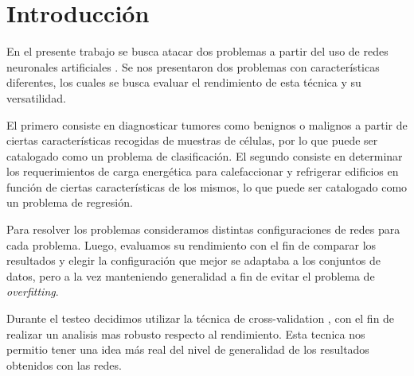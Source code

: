 \documentclass[informe.tex]{subfiles}
\begin{document}
  
  \section{Introducción}

  En el presente trabajo se busca atacar dos problemas a partir del uso de redes neuronales artificiales \cite{hertz}. Se nos presentaron dos problemas con características diferentes, los cuales se busca evaluar el rendimiento de esta técnica y su versatilidad. 
  
  El primero consiste en diagnosticar tumores como benignos o malignos a partir de ciertas características recogidas de muestras de células, por lo que puede ser catalogado como un problema de clasificación. El segundo consiste en determinar los requerimientos de carga energética para calefaccionar y refrigerar edificios en función de ciertas características de los mismos, lo que puede ser catalogado como un problema de regresión.
  
  Para resolver los problemas consideramos distintas configuraciones de redes para cada problema. Luego, evaluamos su rendimiento con el fin de comparar los resultados y elegir la configuración que mejor se adaptaba a los conjuntos de datos, pero a la vez manteniendo generalidad a fin de evitar el problema de \emph{overfitting}.
  
  Durante el testeo decidimos utilizar la técnica de cross-validation \cite{haykin}, con el fin de realizar un analisis mas robusto respecto al rendimiento. Esta tecnica nos permitio tener una idea más real del nivel de generalidad de los resultados obtenidos con las redes.
  
\end{document}
